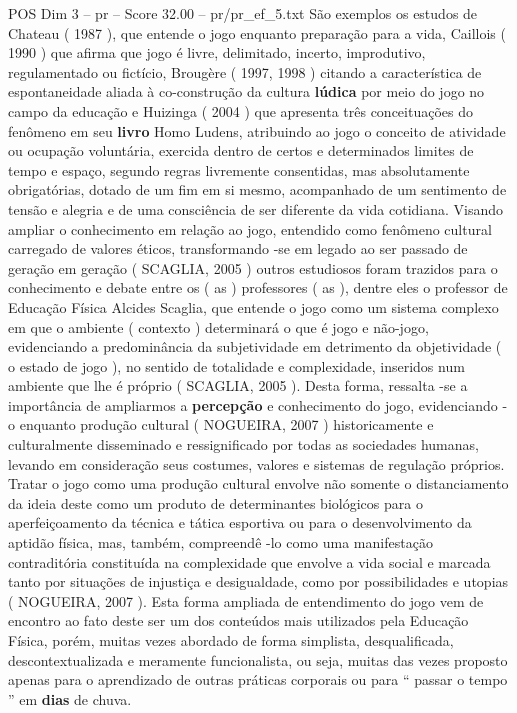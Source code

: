 \begin{textsample}{POS Dim 3 – pr – Score 32.00 – pr/pr\_ef\_5.txt}
São exemplos os estudos de Chateau ( 1987 ), que entende o jogo enquanto preparação para a vida, Caillois ( 1990 ) que afirma que jogo é livre, delimitado, incerto, improdutivo, regulamentado ou fictício, Brougère ( 1997, 1998 ) citando a característica de espontaneidade aliada à co-construção da cultura \textbf{lúdica} por meio do jogo no campo da educação e Huizinga ( 2004 ) que apresenta três conceituações do fenômeno em seu \textbf{livro} Homo Ludens, atribuindo ao jogo o conceito de atividade ou ocupação voluntária, exercida dentro de certos e determinados limites de tempo e espaço, segundo regras livremente consentidas, mas absolutamente obrigatórias, dotado de um fim em si mesmo, acompanhado de um sentimento de tensão e alegria e de uma consciência de ser diferente da vida cotidiana.
Visando ampliar o conhecimento em relação ao jogo, entendido como fenômeno cultural carregado de valores éticos, transformando -se em legado ao ser passado de geração em geração ( SCAGLIA, 2005 ) outros estudiosos foram trazidos para o conhecimento e debate entre os ( as ) professores ( as ), dentre eles o professor de Educação Física Alcides Scaglia, que entende o jogo como um sistema complexo em que o ambiente ( contexto ) determinará o que é jogo e não-jogo, evidenciando a predominância da subjetividade em detrimento da objetividade ( o estado de jogo ), no sentido de totalidade e complexidade, inseridos num ambiente que lhe é próprio ( SCAGLIA, 2005 ).
Desta forma, ressalta -se a importância de ampliarmos a \textbf{percepção} e conhecimento do jogo, evidenciando -o enquanto produção cultural ( NOGUEIRA, 2007 ) historicamente e culturalmente disseminado e ressignificado por todas as sociedades humanas, levando em consideração seus costumes, valores e sistemas de regulação próprios.
Tratar o jogo como uma produção cultural envolve não somente o distanciamento da ideia deste como um produto de determinantes biológicos para o aperfeiçoamento da técnica e tática esportiva ou para o desenvolvimento da aptidão física, mas, também, compreendê -lo como uma manifestação contraditória constituída na complexidade que envolve a vida social e marcada tanto por situações de injustiça e desigualdade, como por possibilidades e utopias ( NOGUEIRA, 2007 ).
Esta forma ampliada de entendimento do jogo vem de encontro ao fato deste ser um dos conteúdos mais utilizados pela Educação Física, porém, muitas vezes abordado de forma simplista, desqualificada, descontextualizada e meramente funcionalista, ou seja, muitas das vezes proposto apenas para o aprendizado de outras práticas corporais ou para “ passar o tempo ” em \textbf{dias} de chuva.

\end{textsample}

